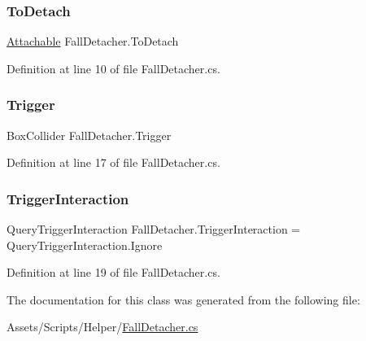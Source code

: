 \subsubsection{\texorpdfstring{To\+Detach}{ToDetach}}
{\footnotesize\ttfamily \mbox{\hyperlink{class_attachable}{Attachable}} Fall\+Detacher.\+To\+Detach}



Definition at line 10 of file Fall\+Detacher.\+cs.

\mbox{\label{class_fall_detacher_afd5f218efddea93eb9719887f7e3f626}} 
\subsubsection{\texorpdfstring{Trigger}{Trigger}}
{\footnotesize\ttfamily Box\+Collider Fall\+Detacher.\+Trigger}



Definition at line 17 of file Fall\+Detacher.\+cs.

\mbox{\label{class_fall_detacher_a6766b4c631f6df7859c17f9cc9750167}} 
\subsubsection{\texorpdfstring{Trigger\+Interaction}{TriggerInteraction}}
{\footnotesize\ttfamily Query\+Trigger\+Interaction Fall\+Detacher.\+Trigger\+Interaction = Query\+Trigger\+Interaction.\+Ignore}



Definition at line 19 of file Fall\+Detacher.\+cs.



The documentation for this class was generated from the following file\+:\begin{DoxyCompactItemize}
\item 
Assets/\+Scripts/\+Helper/\mbox{\hyperlink{_fall_detacher_8cs}{Fall\+Detacher.\+cs}}\end{DoxyCompactItemize}

